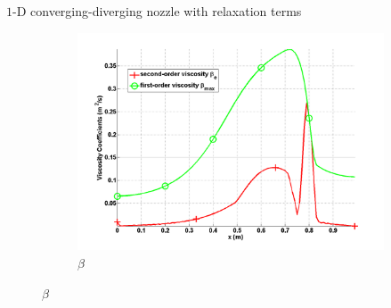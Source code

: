 \documentclass[xcolor=dvipsnames,10pt]{beamer}
\begin{document}
\begin{frame}{$1$-D converging-diverging nozzle with relaxation terms}
\begin{figure}[H]
\begin{subfigure}[b]{0.38\textwidth}
\centering
\includegraphics[width=\textwidth]{../figures/SEM/Aint1e4_liquid_beta.png}
\caption{$\beta$}
\end{subfigure}
\end{figure}
\end{frame}
\end{document}
